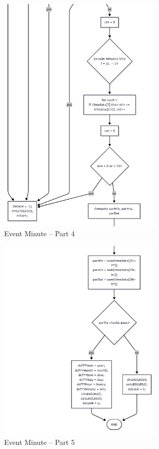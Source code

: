\documentclass[a4paper,12pt]{article}
\begin{document}
\begin{figure}[H]
    \centering
    \includegraphics[width=0.7\textwidth]{diagrams/eventMinute/eventMinute4.png}
    \caption{Event Minute – Part 4}
    \label{fig:eventMinute4}
\end{figure}

\begin{figure}[H]
    \centering
    \includegraphics[width=0.7\textwidth]{diagrams/eventMinute/eventMinute5.png}
    \caption{Event Minute – Part 5}
    \label{fig:eventMinute5}
\end{figure}
\end{document}
